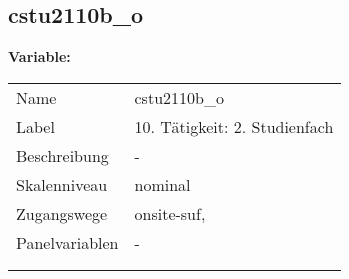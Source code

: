	
	
	\subsection{cstu2110b\_o}
	\label{subSection:cstu2110b_o}

	\noindent\textbf{Variable:}\\
		\begin{tabular}{lL{11.3cm}}
			\label{tableVariable:cstu2110b_o}
			Name & cstu2110b\_o \\
			Label & 10. Tätigkeit: 2. Studienfach \\
			Beschreibung & - \\
			Skalenniveau & nominal \\
			Zugangswege &
				onsite-suf,
 \\
			Panelvariablen & -
			 \\
			 \\
 \\
		\end{tabular}







